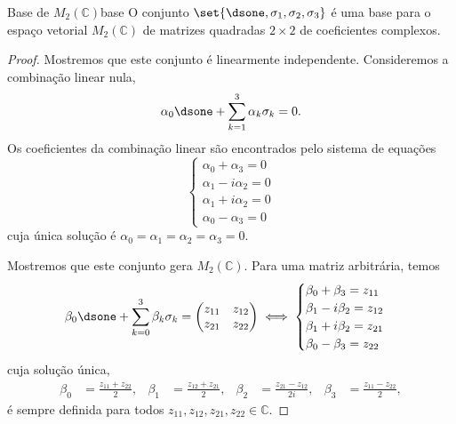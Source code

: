 \begin{proposition}{Base de \(M_2(\mathbb{C})\)}{base}
    O conjunto \(\set{\dsone, \sigma_1, \sigma_2, \sigma_3}\) é uma base para o espaço vetorial \(M_2(\mathbb{C})\) de matrizes quadradas \(2\times 2\) de coeficientes complexos.
\end{proposition}
\begin{proof}
    Mostremos que este conjunto é linearmente independente. Consideremos a combinação linear nula,
    \begin{equation*}
        \alpha_0 \dsone + \sum_{k=1}^3\alpha_k \sigma_k = 0.
    \end{equation*}
    Os coeficientes da combinação linear são encontrados pelo sistema de equações
    \begin{equation*}
        \begin{cases}
            \alpha_0 + \alpha_3 = 0\\
            \alpha_1 - i \alpha_2 = 0\\
            \alpha_1 + i \alpha_2 = 0\\
            \alpha_0 - \alpha_3 = 0
        \end{cases}
    \end{equation*}
    cuja única solução é \(\alpha_0 = \alpha_1 = \alpha_2 = \alpha_3 = 0\).

    Mostremos que este conjunto gera \(M_2(\mathbb{C})\). Para uma matriz arbitrária, temos
    \begin{equation*}
        \beta_0 \dsone + \sum_{k = 0}^3 \beta_k \sigma_k = \begin{pmatrix}
            z_{11}&z_{12}\\z_{21}&z_{22}
        \end{pmatrix}
        \iff
        \begin{cases}
            \beta_0 + \beta_3 = z_{11}\\
            \beta_1 - i \beta_2 = z_{12}\\
            \beta_1 + i \beta_2 = z_{21}\\
            \beta_0 - \beta_3 = z_{22}
        \end{cases}
    \end{equation*}
    cuja solução única,
    \begin{align*}
        \beta_0 &= \frac{z_{11} + z_{22}}{2},&
        \beta_1 &= \frac{z_{12} + z_{21}}{2},&
        \beta_2 &= \frac{z_{21} - z_{12}}{2i},&
        \beta_3 &= \frac{z_{11} - z_{22}}{2},
    \end{align*}
    é sempre definida para todos \(z_{11}, z_{12}, z_{21}, z_{22} \in \mathbb{C}\).
\end{proof}

